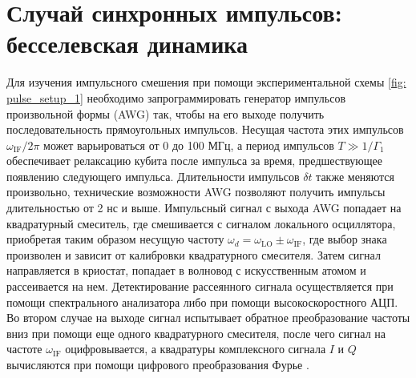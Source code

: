 \section{Случай синхронных импульсов: бесселевская динамика}
\label{sec: bessels}
Для изучения импульсного смешения при помощи экспериментальной схемы \ref{fig: pulse_setup_1} необходимо запрограммировать генератор импульсов произвольной формы (AWG) так, чтобы на его выходе получить последовательность прямоугольных импульсов. Несущая частота этих импульсов $\omega_{\text{IF}}/2\pi$ может варьироваться от 0 до 100 МГц, а период импульсов $T\gg 1/\Gamma_1$ обеспечивает релаксацию кубита после импульса за время, предшествующее появлению следующего импульса. Длительности импульсов $\delta t$ также меняются произвольно, технические возможности AWG позволяют получить импульсы длительностью от 2 нс и выше. Импульсный сигнал с выхода AWG попадает на квадратурный смеситель, где смешивается с сигналом локального осциллятора, приобретая таким образом несущую частоту $\omega_{d} = \omega_{\text{LO}}\pm\omega_{\text{IF}}$, где выбор знака произволен и зависит от калибровки квадратурного смесителя. Затем сигнал направляется в криостат, попадает в волновод с искусственным атомом и рассеивается на нем.  Детектирование рассеянного сигнала осуществляется при помощи спектрального анализатора либо при помощи высокоскоростного АЦП. Во втором случае на выходе сигнал испытывает обратное преобразование частоты вниз при помощи еще одного квадратурного смесителя, после чего сигнал на частоте $\omega_{\text{IF}}$ оцифровывается, а квадратуры комплексного сигнала $I$ и $Q$ вычисляются при помощи цифрового преобразования Фурье \cite{sank2014fast}.


